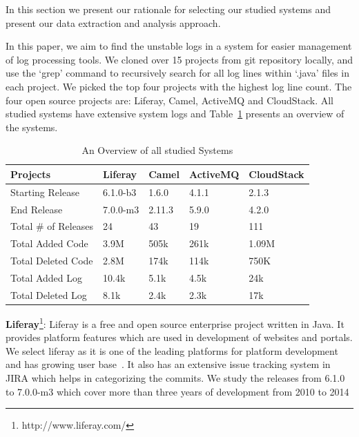 In this section we present our rationale for selecting our studied systems and present our data extraction and analysis approach.


In this paper, we aim to find the unstable logs in a system for easier management of log processing tools. We cloned over 15 projects from git repository locally, and use the `grep' command to recursively search for all log lines within `.java' files in each project. We picked the top four projects with the highest log line count. The four open source projects are: Liferay, Camel, ActiveMQ and CloudStack. All studied systems have extensive system logs and Table~\ref{tba:overviewsystems} presents an overview of the systems.

\begin{table}[tbh]
\centering \protect\caption{An Overview of all studied Systems}


\label{tba:overviewsystems} %
\begin{tabular}{lllll}
\hline 
Projects  & Liferay  & Camel  & ActiveMQ  & CloudStack \tabularnewline
\hline 
Starting Release  & 6.1.0-b3  & 1.6.0  & 4.1.1  & 2.1.3 \tabularnewline
End Release  &7.0.0-m3  & 2.11.3  & 5.9.0  & 4.2.0 \tabularnewline
Total \# of Releases   & 24  & 43  & 19 & 111 \tabularnewline
Total Added Code  & 3.9M  & 505k  & 261k  & 1.09M \tabularnewline
Total Deleted Code  & 2.8M  & 174k  & 114k  & 750K \tabularnewline
Total Added Log  & 10.4k  & 5.1k  & 4.5k  & 24k \tabularnewline
Total Deleted Log  & 8.1k  & 2.4k  & 2.3k  & 17k \tabularnewline
\hline 
\end{tabular}
\end{table}

\textbf{Liferay}\footnote[1]{http://www.liferay.com/}:  Liferay is a free and open source enterprise project written in Java. It provides platform features which are used in development of websites and portals. We select liferay as it is one of the leading platforms for platform development~\cite{LiferayGartner} and has growing user base~\cite{LiferayUser}. It also has an extensive issue tracking system in JIRA which helps in categorizing the commits. We study the releases from 6.1.0 to 7.0.0-m3 which cover more than three years of development from 2010 to 2014



